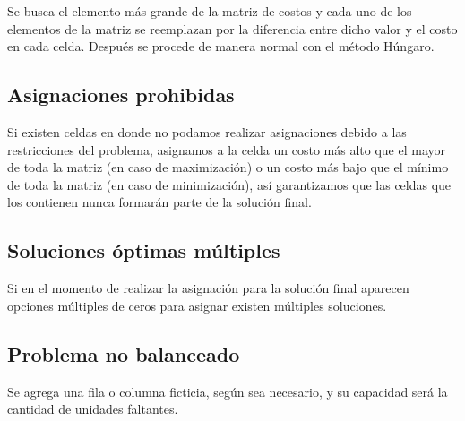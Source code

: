 	Se busca el elemento más grande de la matriz de costos y cada uno de los elementos de la matriz se reemplazan por la diferencia entre dicho valor y el costo en cada celda. Después se procede de manera normal con el método Húngaro.
	
	\subsection{Asignaciones prohibidas}

	Si existen celdas en donde no podamos realizar asignaciones debido a las restricciones del problema, asignamos a la celda un costo más alto que el mayor de toda la matriz (en caso de maximización) o un costo más bajo que el mínimo de toda la matriz (en caso de minimización), así garantizamos que las celdas que los contienen nunca formarán parte de la solución final.
	
	\subsection{Soluciones óptimas múltiples}
	
	Si en el momento de realizar la asignación para la solución final aparecen opciones múltiples de ceros para asignar existen múltiples soluciones.
	
	\subsection{Problema no balanceado}
	
	Se agrega una fila o columna ficticia, según sea necesario, y su capacidad será la cantidad de unidades faltantes.
	